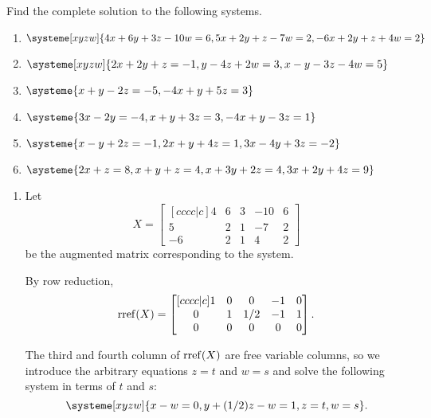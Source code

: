 \begin{exercises}
	\begin{problist}
		\prob Find the complete solution to the following systems.
		\begin{enumerate}
			\item $\systeme[xyzw]{4x+6y+3z-10w=6,5x+2y+z-7w=2,-6x+2y+z+4w=2}$
			\item $\systeme[xyzw]{2x+2y+z=-1,y-4z+2w=3,x-y-3z-4w=5}$
			\item $\systeme{x+y-2z=-5,-4x+y+5z=3}$
			\item $\systeme{3x-2y=-4,x+y+3z=3,-4x+y-3z=1}$
			\item $\systeme{x-y+2z=-1,2x+y+4z=1,3x-4y+3z=-2}$
			\item $\systeme{2x+z=8,x+y+z=4,x+3y+2z=4,3x+2y+4z=9}$
		\end{enumerate}
		\begin{solution}
			\begin{enumerate}
				\item 
				Let
				\[
					X=
					\begin{bmatrix}[cccc|c]
						4 & 6 & 3 & -10 & 6\\
						5 & 2 & 1 & -7 & 2\\
						-6 & 2 & 1 & 4 & 2
					\end{bmatrix}
				\]
				be the augmented matrix corresponding to the system.
				
				By row reduction,
				\[
					\operatorname{rref}(X)=
					\begin{bmatrix}[cccc|c]
						1 & 0 & 0 & -1 & 0\\
						0 & 1 & 1/2 & -1 & 1\\
						0 & 0 & 0 & 0 & 0
					\end{bmatrix}.
				\]
				
				The third and fourth column of $\operatorname{rref}(X)$ are free variable columns,
				so we introduce the arbitrary equations $z=t$ and $w=s$ and
				solve the following system in terms of $t$ and $s$:
				\[
					\systeme[xyzw]{x-w=0,y+(1/2)z-w=1,z=t,w=s}.
				\]
				

\end{enumerate}
\end{solution}
\end{problist}
\end{exercises}
